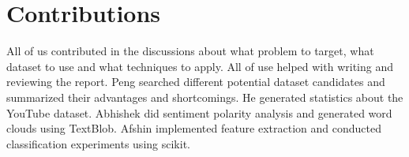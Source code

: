 \section{Contributions}
\label{contributions}
All of us contributed in the discussions about what problem to target, what dataset to use and what techniques to apply.
All of use helped with writing and reviewing the report.
Peng searched different potential dataset candidates and summarized their advantages and shortcomings.
He generated statistics about the YouTube dataset.
Abhishek did sentiment polarity analysis and generated word clouds using TextBlob.
Afshin implemented feature extraction and conducted classification experiments using scikit.